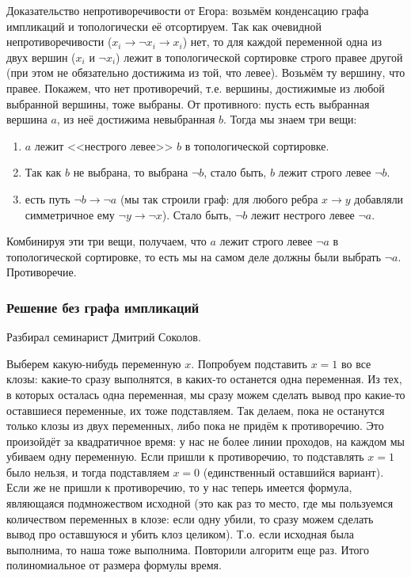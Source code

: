 	Доказательство непротиворечивости от Егора: возьмём конденсацию графа импликаций и топологически её отсортируем.
	Так как очевидной непротиворечивости ($x_i \to \lnot x_i \to x_i$) нет, то для 
	каждой переменной одна из двух вершин ($x_i$ и $\lnot x_i$) лежит в топологической сортировке строго правее другой
	(при этом не обязательно достижима из той, что левее).
	Возьмём ту вершину, что правее.
	Покажем, что нет противоречий, т.е. вершины, достижимые из любой выбранной вершины, тоже выбраны.
	От противного: пусть есть выбранная вершина $a$, из неё достижима невыбранная $b$.
	Тогда мы знаем три вещи:
	\begin{enumerate}
		\item $a$ лежит <<нестрого левее>> $b$ в топологической сортировке.
		\item Так как $b$ не выбрана, то выбрана $\lnot b$, стало быть, $b$ лежит строго левее $\lnot b$.
		\item
			есть путь $\lnot b \to \lnot a$ (мы так строили граф: для любого ребра $x \to y$
			добавляли симметричное ему $\lnot y \to \lnot x$).
			Стало быть, $\lnot b$ лежит нестрого левее $\lnot a$.
	\end{enumerate}
	Комбинируя эти три вещи, получаем, что $a$ лежит строго левее $\lnot a$ в топологической сортировке,
	то есть мы на самом деле должны были выбрать $\lnot a$.
	Противоречие.

\subsubsection{Решение без графа импликаций}
	Разбирал семинарист Дмитрий Соколов.

	Выберем какую-нибудь переменную $x$.
	Попробуем подставить $x=1$ во все клозы: какие-то сразу выполнятся,
	в каких-то останется одна переменная.
	Из тех, в которых осталась одна переменная, мы сразу можем сделать вывод про какие-то оставшиеся переменные,
	их тоже подставляем.
	Так делаем, пока не останутся только клозы из двух переменных, либо пока не придём
	к противоречию.
	Это произойдёт за квадратичное время: у нас не более линии проходов, на каждом мы убиваем одну переменную.
	Если пришли к противоречию, то подставлять $x=1$ было нельзя, и тогда подставляем $x=0$ (единственный оставшийся вариант).
	Если же не пришли к противоречию, то у нас теперь имеется формула, являющаяся подмножеством исходной
	(это как раз то место, где мы пользуемся количеством переменных в клозе: если одну убили, то сразу можем
	сделать вывод про оставшуюся и убить клоз целиком).
	Т.о. если исходная была выполнима, то наша тоже выполнима.
	Повторили алгоритм еще раз.
	Итого полиномиальное от размера формулы время.

